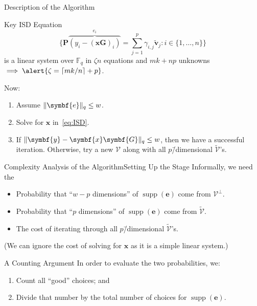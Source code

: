 \documentclass[usepdftitle=false]{beamer}
\renewcommand*{\vec}{\symbf}%
\newcommand*{\mat}{\symbf}%
\DeclareMathOperator{\supp}{supp}%
\newcommand*{\FF}{\ensuremath{\mathbb{F}}}%
\DeclarePairedDelimiter{\ceil}{\lceil}{\rceil}%
\DeclarePairedDelimiter{\norm}{\lVert}{\rVert}%
\newcommand*{\normR}[2]{\ensuremath{\norm{#1}_{#2}}}%
\begin{document}
\begin{frame}{Description of the Algorithm}
  \begin{alertblock}{Key ISD Equation}
    \begin{equation}\label{eq:ISD}
      \{\mat{P} \overbrace{(y_i - {(\vec{x} \mat{G})}_i)}^{e_i} = \sum_{j
        = 1}^p \gamma_{i, j} \tilde{\vec{v}}_j : i \in \{1, \ldots,
      n\}\}
    \end{equation}
    is a linear system over \(\FF_q\) in \(\zeta n\) equations and
    \(m k + n p\) unknowns
    \(\implies \alert{\zeta = \ceil{m k / {n}} + p}\).
  \end{alertblock}
  Now:
  \begin{enumerate}
  \item Assume \(\normR{\vec{e}}{q} \le w\).
  \item Solve for \(\vec{x}\) in~\eqref{eq:ISD}.
  \item If \(\normR{\vec{y} - \vec{x} \mat{G}}{q} \le w\), then we
    have a successful iteration.  Otherwise, try a new \(\mathcal{V}\)
    along with all \(p\)\=/dimensional \(\tilde{\mathcal{V}}\)'s.
  \end{enumerate}
\end{frame}

\begin{frame}{Complexity Analysis of the Algorithm}{Setting Up the Stage}
  Informally, we need the
  \begin{itemize}
  \item Probability that \enquote{\(w - p\) dimensions} of
    \(\supp(\vec{e})\) come from \(\mathcal{V}^{\perp}\).
  \item Probability that \enquote{\(p\) dimensions} of
    \(\supp(\vec{e})\) come from \(\tilde{\mathcal{V}}\).
  \item The cost of iterating through all \(p\)\=/dimensional
    \(\tilde{\mathcal{V}}\)'s.
  \end{itemize}
  (We can ignore the cost of solving for \(\vec{x}\) as it is a simple
  linear system.)
  \begin{alertblock}{A Counting Argument}
    In order to evaluate the two probabilities, we:
    \begin{enumerate}
    \item Count all \enquote{good} choices; and
    \item Divide that number by the total number of choices for
      \(\supp(\vec{e})\).
    \end{enumerate}
  \end{alertblock}
\end{frame}
\end{document}

